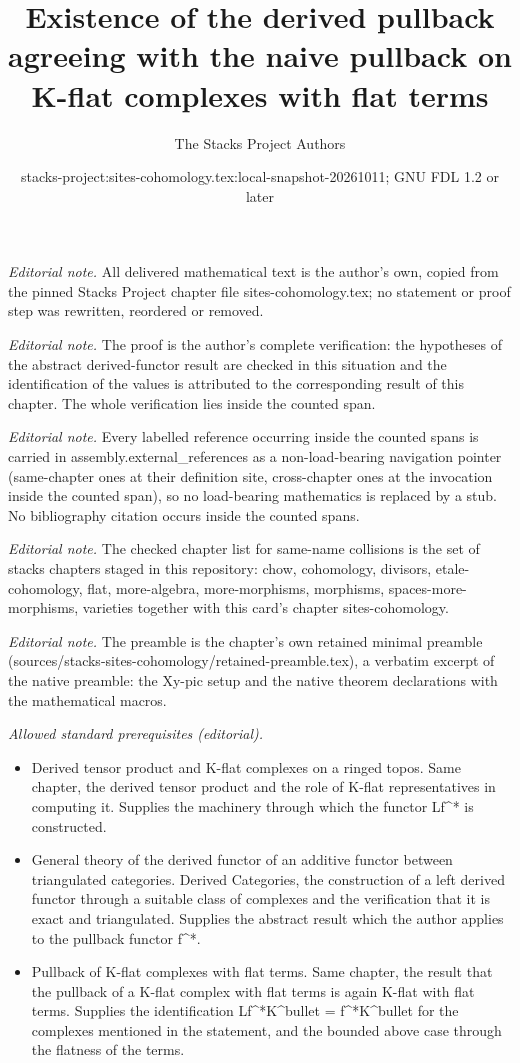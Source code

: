 \documentclass[10pt,a4paper]{amsart}
\title{Existence of the derived pullback agreeing with the naive pullback on K-flat complexes with flat terms}
\author{The Stacks Project Authors}
\date{stacks-project:sites-cohomology.tex:local-snapshot-20261011; GNU FDL 1.2 or later}
\theoremstyle{plain}
\theoremstyle{definition}
\theoremstyle{remark}
\numberwithin{equation}{subsection}
\begin{document}
\maketitle
\noindent\textit{Editorial note.} All delivered mathematical text is the author's own, copied from the pinned Stacks Project chapter file sites-cohomology.tex; no statement or proof step was rewritten, reordered or removed.\par\medskip
\noindent\textit{Editorial note.} The proof is the author's complete verification: the hypotheses of the abstract derived-functor result are checked in this situation and the identification of the values is attributed to the corresponding result of this chapter. The whole verification lies inside the counted span.\par\medskip
\noindent\textit{Editorial note.} Every labelled reference occurring inside the counted spans is carried in assembly.external\_references as a non-load-bearing navigation pointer (same-chapter ones at their definition site, cross-chapter ones at the invocation inside the counted span), so no load-bearing mathematics is replaced by a stub. No bibliography citation occurs inside the counted spans.\par\medskip
\noindent\textit{Editorial note.} The checked chapter list for same-name collisions is the set of stacks chapters staged in this repository: chow, cohomology, divisors, etale-cohomology, flat, more-algebra, more-morphisms, morphisms, spaces-more-morphisms, varieties together with this card's chapter sites-cohomology.\par\medskip
\noindent\textit{Editorial note.} The preamble is the chapter's own retained minimal preamble (sources/stacks-sites-cohomology/retained-preamble.tex), a verbatim excerpt of the native preamble: the Xy-pic setup and the native theorem declarations with the mathematical macros.\par\medskip
\noindent\textit{Allowed standard prerequisites (editorial).}\begin{itemize}
\item Derived tensor product and K-flat complexes on a ringed topos. Same chapter, the derived tensor product and the role of K-flat representatives in computing it. Supplies the machinery through which the functor Lf\textasciicircum{}* is constructed.
\item General theory of the derived functor of an additive functor between triangulated categories. Derived Categories, the construction of a left derived functor through a suitable class of complexes and the verification that it is exact and triangulated. Supplies the abstract result which the author applies to the pullback functor f\textasciicircum{}*.
\item Pullback of K-flat complexes with flat terms. Same chapter, the result that the pullback of a K-flat complex with flat terms is again K-flat with flat terms. Supplies the identification Lf\textasciicircum{}*K\textasciicircum{}bullet = f\textasciicircum{}*K\textasciicircum{}bullet for the complexes mentioned in the statement, and the bounded above case through the flatness of the terms.
\end{itemize}\medskip
\end{document}
